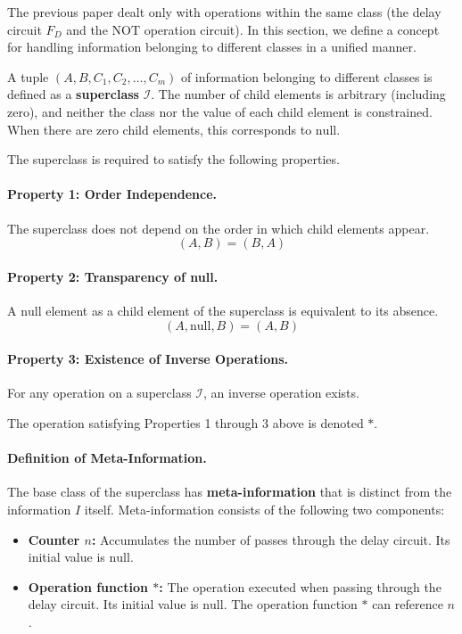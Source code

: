 \documentclass[12pt,a4paper]{article}
\begin{document}
The previous paper \cite{kihara2026} dealt only with operations within the same class (the delay
circuit $F_D$ and the NOT operation circuit). In this section, we define a concept for handling
information belonging to different classes in a unified manner.

A tuple $(A, B, C_1, C_2, \ldots, C_m)$ of information belonging to different classes is defined
as a \textbf{superclass} $\mathcal{I}$. The number of child elements is arbitrary (including zero),
and neither the class nor the value of each child element is constrained. When there are zero child
elements, this corresponds to $\mathrm{null}$.

The superclass is required to satisfy the following properties.

\paragraph{Property 1: Order Independence.}
The superclass does not depend on the order in which child elements appear.
\[
  (A, B) = (B, A)
\]

\paragraph{Property 2: Transparency of null.}
A $\mathrm{null}$ element as a child element of the superclass is equivalent to its absence.
\[
  (A, \mathrm{null}, B) = (A, B)
\]

\paragraph{Property 3: Existence of Inverse Operations.}
For any operation on a superclass $\mathcal{I}$, an inverse operation exists.

The operation satisfying Properties 1 through 3 above is denoted $*$.

\paragraph{Definition of Meta-Information.}
The base class of the superclass has \textbf{meta-information} that is distinct from the
information $I$ itself. Meta-information consists of the following two components:

\begin{itemize}
  \item \textbf{Counter $n$:} Accumulates the number of passes through the delay circuit. Its
        initial value is $\mathrm{null}$.
  \item \textbf{Operation function $*$:} The operation executed when passing through the delay
        circuit. Its initial value is $\mathrm{null}$. The operation function $*$ can reference $n$.
\end{itemize}
\end{document}

